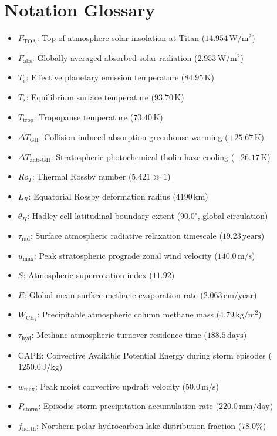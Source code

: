 \documentclass[11pt,a4paper]{article}
\begin{document}
\appendix
\section{Notation Glossary}
\begin{itemize}
    \item $F_{\mathrm{TOA}}$: Top-of-atmosphere solar insolation at Titan ($14.954\,\mathrm{W/m^2}$)
    \item $F_{\mathrm{abs}}$: Globally averaged absorbed solar radiation ($2.953\,\mathrm{W/m^2}$)
    \item $T_e$: Effective planetary emission temperature ($84.95\,\mathrm{K}$)
    \item $T_s$: Equilibrium surface temperature ($93.70\,\mathrm{K}$)
    \item $T_{\mathrm{trop}}$: Tropopause temperature ($70.40\,\mathrm{K}$)
    \item $\Delta T_{\mathrm{GH}}$: Collision-induced absorption greenhouse warming ($+25.67\,\mathrm{K}$)
    \item $\Delta T_{\mathrm{anti\text{-}GH}}$: Stratospheric photochemical tholin haze cooling ($-26.17\,\mathrm{K}$)
    \item $Ro_T$: Thermal Rossby number ($5.421 \gg 1$)
    \item $L_R$: Equatorial Rossby deformation radius ($4190\,\mathrm{km}$)
    \item $\theta_H$: Hadley cell latitudinal boundary extent ($90.0^\circ$, global circulation)
    \item $\tau_{\mathrm{rad}}$: Surface atmospheric radiative relaxation timescale ($19.23\,\mathrm{years}$)
    \item $u_{\mathrm{max}}$: Peak stratospheric prograde zonal wind velocity ($140.0\,\mathrm{m/s}$)
    \item $S$: Atmospheric superrotation index ($11.92$)
    \item $E$: Global mean surface methane evaporation rate ($2.063\,\mathrm{cm/year}$)
    \item $W_{\mathrm{CH}_4}$: Precipitable atmospheric column methane mass ($4.79\,\mathrm{kg/m^2}$)
    \item $\tau_{\mathrm{hyd}}$: Methane atmospheric turnover residence time ($188.5\,\mathrm{days}$)
    \item $\mathrm{CAPE}$: Convective Available Potential Energy during storm episodes ($1250.0\,\mathrm{J/kg}$)
    \item $w_{\mathrm{max}}$: Peak moist convective updraft velocity ($50.0\,\mathrm{m/s}$)
    \item $P_{\mathrm{storm}}$: Episodic storm precipitation accumulation rate ($220.0\,\mathrm{mm/day}$)
    \item $f_{\mathrm{north}}$: Northern polar hydrocarbon lake distribution fraction ($78.0\%$)
\end{itemize}
\end{document}
